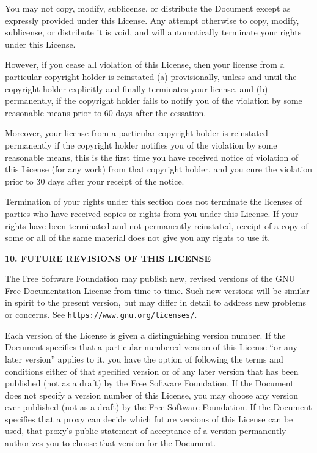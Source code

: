 \documentclass[onesize, a4paper]{refart}
\begin{document}
You may not copy, modify, sublicense, or distribute the Document
except as expressly provided under this License.  Any attempt
otherwise to copy, modify, sublicense, or distribute it is void, and
will automatically terminate your rights under this License.

However, if you cease all violation of this License, then your license
from a particular copyright holder is reinstated (a) provisionally,
unless and until the copyright holder explicitly and finally
terminates your license, and (b) permanently, if the copyright holder
fails to notify you of the violation by some reasonable means prior to
60 days after the cessation.

Moreover, your license from a particular copyright holder is
reinstated permanently if the copyright holder notifies you of the
violation by some reasonable means, this is the first time you have
received notice of violation of this License (for any work) from that
copyright holder, and you cure the violation prior to 30 days after
your receipt of the notice.

Termination of your rights under this section does not terminate the
licenses of parties who have received copies or rights from you under
this License.  If your rights have been terminated and not permanently
reinstated, receipt of a copy of some or all of the same material does
not give you any rights to use it.


\begin{center}
{\bf 10. FUTURE REVISIONS OF THIS LICENSE\par}
\end{center}


The Free Software Foundation may publish new, revised versions
of the GNU Free Documentation License from time to time.  Such new
versions will be similar in spirit to the present version, but may
differ in detail to address new problems or concerns.  See
\texttt{https://www.gnu.org/licenses/}.

Each version of the License is given a distinguishing version number.
If the Document specifies that a particular numbered version of this
License ``or any later version'' applies to it, you have the option of
following the terms and conditions either of that specified version or
of any later version that has been published (not as a draft) by the
Free Software Foundation.  If the Document does not specify a version
number of this License, you may choose any version ever published (not
as a draft) by the Free Software Foundation.  If the Document
specifies that a proxy can decide which future versions of this
License can be used, that proxy's public statement of acceptance of a
version permanently authorizes you to choose that version for the
Document.
\end{document}
